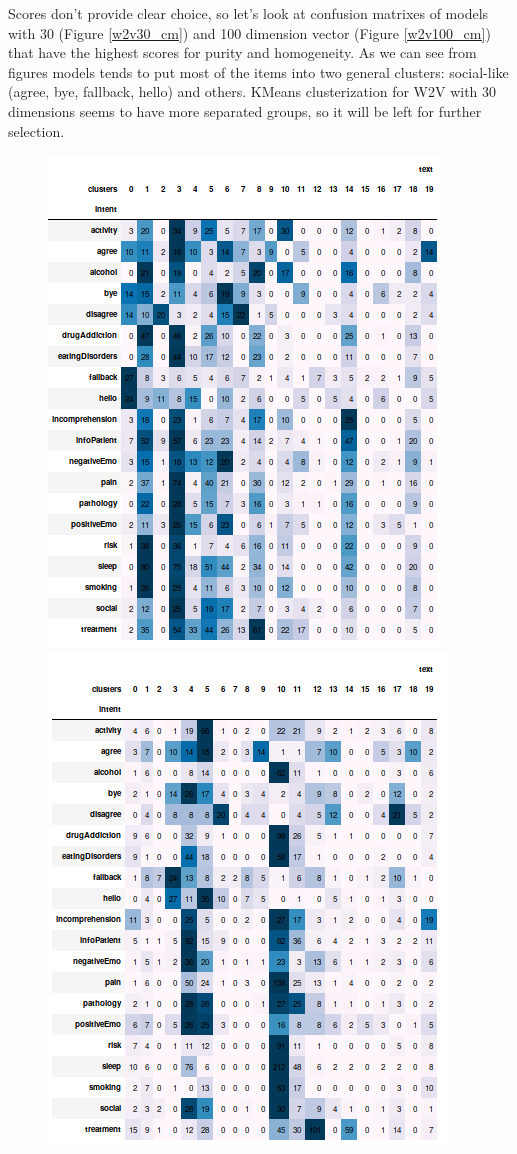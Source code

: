 \documentclass[11pt]{article}
\begin{document}
Scores don't provide clear choice, so let's look at confusion matrixes of models with 30 (Figure \ref{w2v30_cm}) and 100 dimension vector (Figure \ref{w2v100_cm}) that have the highest scores for purity and homogeneity. As we can see from figures models tends to put most of the items into two general clusters: social-like (agree, bye, fallback, hello) and others. KMeans clusterization for W2V with 30 dimensions seems to have more separated groups, so it will be left for further selection.

\begin{figure}[h]
	\centering
	\includegraphics[scale=0.28]{w2v30_ac.png}
	\includegraphics[scale=0.28]{w2v30_gm.png}

\end{figure}
\end{document}
